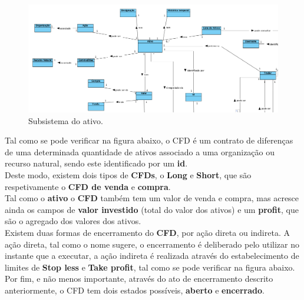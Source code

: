 \documentclass[11pt,a4paper]{report}%
\begin{document}
\begin{figure}[H]
	\centering
	\includegraphics[scale=0.5]{modelo-dominio-2.png}
	\caption{Subsistema do ativo. }
	\label{img:pag}
\end{figure}
Tal como se pode verificar na figura abaixo, o CFD é um contrato de diferenças de uma determinada quantidade de ativos associado a uma organização ou recurso natural, sendo este identificado por um \textbf{id}. \\
Deste modo, existem dois tipos de \textbf{CFDs}, o \textbf{Long} e \textbf{Short}, que são respetivamente o \textbf{CFD de venda} e \textbf{compra}. \\Tal como o \textbf{ativo} o \textbf{CFD} também tem um valor de venda e compra, mas acresce ainda os campos de \textbf{valor investido} (total do valor dos ativos) e um \textbf{profit}, que são o agregado dos valores dos ativos.\\Existem duas formas de encerramento do \textbf{CFD}, por ação direta ou indireta. A ação direta, tal como o nome sugere, o encerramento é deliberado pelo utilizar no instante que a executar, a ação indireta é realizada através do estabelecimento de limites de \textbf{Stop less} e \textbf{Take profit}, tal como se pode verificar na figura abaixo.\\ Por fim, e não menos importante, através do ato de encerramento descrito anteriormente, o CFD tem dois estados possíveis, \textbf{aberto} e \textbf{encerrado}.
\end{document}
